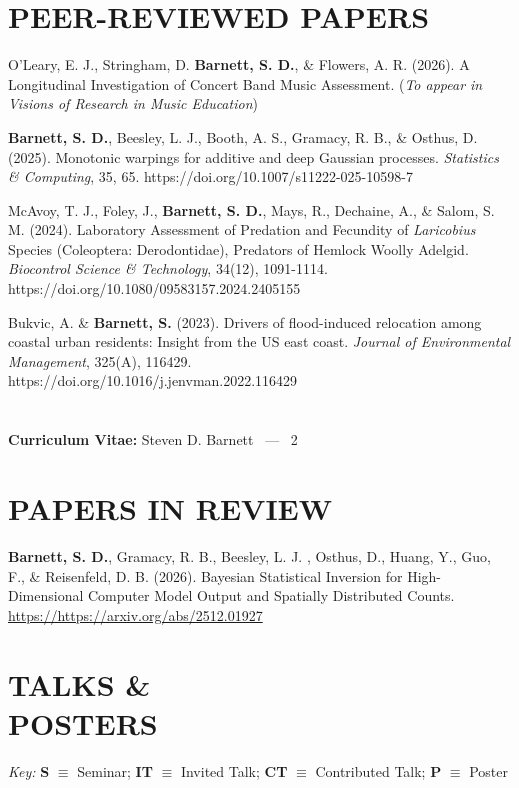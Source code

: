 \documentclass[margin,line]{res}
\begin{document}
\begin{resume}
\section{\bf{PEER-REVIEWED PAPERS}}

O'Leary, E. J., Stringham, D. \textbf{Barnett, S. D.}, \& Flowers, A. R. (2026).
A Longitudinal Investigation of Concert Band Music Assessment. (\textit{To
appear in Visions of Research in Music Education})

\textbf{Barnett, S. D.}, Beesley, L. J., Booth, A. S., Gramacy, R. B., \&
Osthus, D. (2025). Monotonic warpings for additive and deep Gaussian processes.
{\it Statistics \& Computing}, 35, 65.
https://doi.org/10.1007/s11222-025-10598-7

McAvoy, T. J., Foley, J., \textbf{Barnett, S. D.}, Mays, R., Dechaine, A., \&
Salom, S. M. (2024). Laboratory Assessment of Predation and Fecundity of
\textit{Laricobius} Species (Coleoptera: Derodontidae), Predators of Hemlock
Woolly Adelgid. \textit{Biocontrol Science \& Technology}, 34(12), 1091-1114.\\
https://doi.org/10.1080/09583157.2024.2405155

Bukvic, A. \& \textbf{Barnett, S.} (2023). Drivers of flood-induced relocation
among coastal urban residents: Insight from the US east coast. {\it Journal of
Environmental Management}, 325(A), 116429.\\
https://doi.org/10.1016/j.jenvman.2022.116429

\pagebreak
\section{}
\hfill {\bf Curriculum Vitae:} Steven D. Barnett \  --- \  2

\section{\bf{PAPERS IN REVIEW}}

\textbf{Barnett, S. D.}, Gramacy, R. B., Beesley, L. J. , Osthus, D., Huang, Y.,
Guo, F., \& Reisenfeld, D. B. (2026). Bayesian Statistical Inversion for
High-Dimensional Computer Model Output and Spatially Distributed Counts.
\href{https://https://arxiv.org/abs/2512.01927}{https://https://arxiv.org/abs/2512.01927}

\section{\bf TALKS \& \\POSTERS}
{\em Key:}
{\bf S} $\equiv$ Seminar;
{\bf IT} $\equiv$ Invited Talk;
{\bf CT} $\equiv$ Contributed Talk;
{\bf P} $\equiv$ Poster


\end{resume}
\end{document}
